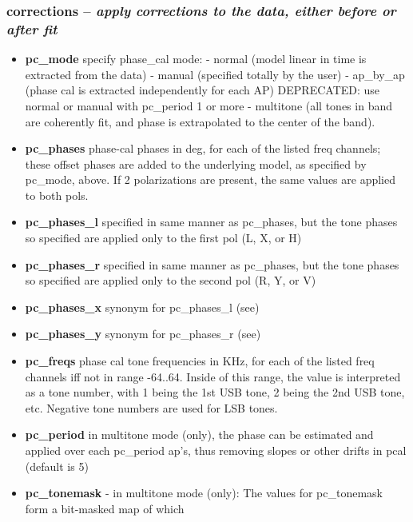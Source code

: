 \subsubsection{corrections -- \textit{apply corrections to the data, either before or after fit}}

\begin{itemize}
\item[]\textbf{pc\_mode}  specify phase\_cal mode:
              - normal (model linear in time is extracted from the data)
              - manual (specified totally by the user) 
              - ap\_by\_ap (phase cal is extracted independently for each AP)
                DEPRECATED: use normal or manual with pc\_period 1 or more
              - multitone (all tones in band are coherently fit, and phase 
                is extrapolated to the center of the band).
\item[]\textbf{pc\_phases} phase-cal phases in deg, for each of the listed freq channels;
             these offset phases are added to the underlying model, as
             specified by pc\_mode, above. If 2 polarizations are present,
             the same values are applied to both pols.
\item[]\textbf{pc\_phases\_l} specified in same manner as pc\_phases, but the tone phases
             so specified are applied only to the first pol (L, X, or H)
\item[]\textbf{pc\_phases\_r} specified in same manner as pc\_phases, but the tone phases
             so specified are applied only to the second pol (R, Y, or V)
\item[]\textbf{pc\_phases\_x} synonym for pc\_phases\_l (see)
\item[]\textbf{pc\_phases\_y} synonym for pc\_phases\_r (see)
\item[]\textbf{pc\_freqs}  phase cal tone frequencies in KHz, for each of the listed
             freq channels iff not in range -64..64. Inside of this
             range, the value is interpreted as a tone number, with 1 being
             the 1st USB tone, 2 being the 2nd USB tone, etc. Negative
             tone numbers are used for LSB tones.
\item[]\textbf{pc\_period} in multitone mode (only), the phase can be estimated
             and applied over each pc\_period ap's, thus removing slopes
             or other drifts in pcal (default is 5)
\item[]\textbf{pc\_tonemask} - in multitone mode (only):
             The values for pc\_tonemask form a bit-masked map of which 

\end{itemize}
